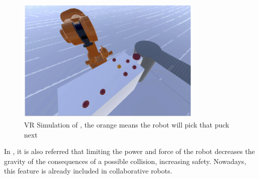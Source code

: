 \begin{figure}[H]
\centerline{\includegraphics[width=3.5in]{figs/reverse.PNG}}
\caption{VR Simulation of \cite{Psarakis2022}, the orange means the robot will pick that puck next}
\label{vr}
\end{figure}

In \cite{Mukherjee2022}, it is also referred that limiting the power and force of the robot decreases the gravity of the consequences of a possible collision, increasing safety. Nowadays, this feature is already included in collaborative robots.